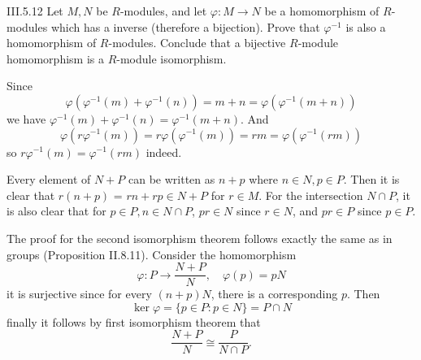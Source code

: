 \begin{problem}{III.5.12}
Let $M,N$ be $R$-modules, and let $\varphi:M \to N$ be a homomorphism of $R$-modules which has a inverse (therefore a bijection). Prove that $\varphi^{-1}$ is also a homomorphism of $R$-modules. Conclude that a bijective $R$-module homomorphism is a $R$-module isomorphism.
\end{problem}
\begin{pf}
Since
\[
\varphi(\varphi^{-1}(m) + \varphi^{-1}(n)) = m + n = \varphi(\varphi^{-1}(m + n))
\]
we have $\varphi^{-1}(m) + \varphi^{-1}(n) = \varphi^{-1}(m + n)$. And
\[
\varphi(r\varphi^{-1}(m)) = r\varphi(\varphi^{-1}(m)) = rm = \varphi(\varphi^{-1}(rm))
\]
so $r\varphi^{-1}(m) = \varphi^{-1}(rm)$ indeed. 
\end{pf}


\begin{pf}
Every element of $N+P$ can be written as $n+p$ where $n \in N, p \in P$. Then it is clear that $r(n+p)$ = $rn + rp \in N+P$ for $r \in M$. For the intersection $N \cap P$, it is also clear that for $p \in P, n \in N \cap P$, $pr \in N$ since $r \in N$, and $pr \in P$ since $p \in P$.

The proof for the second isomorphism theorem follows exactly the same as in groups (Proposition II.8.11). Consider the homomorphism
\[
\varphi: P \to \frac{N+P}{N}, \quad \varphi(p) = pN	
\]
it is surjective since for every $(n+p)N$, there is a corresponding $p$. Then
\[
\ker \varphi = \{p \in P : p \in N\} = P \cap N	
\]
finally it follows by first isomorphism theorem that 
\[
\frac{N+P}{N} \cong \frac{P}{N \cap P}.
\]
\end{pf}

\section{}

